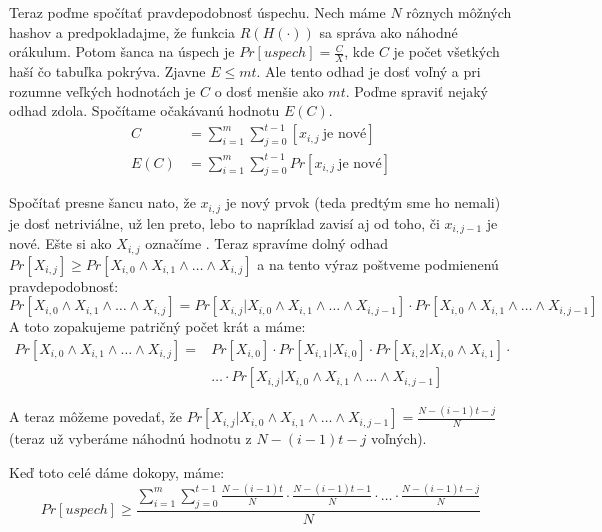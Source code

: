 Teraz poďme spočítať pravdepodobnosť úspechu.
Nech máme $N$ rôznych môžných hashov a predpokladajme, že
funkcia $R(H(\cdot))$ sa správa ako náhodné orákulum.
Potom šanca na úspech je $Pr[uspech] = \frac{C}{X}$,
kde $C$ je počet všetkých haší čo tabuľka pokrýva.
Zjavne $E \leq mt$.
Ale tento odhad je dosť voľný a pri rozumne veľkých hodnotách je $C$ 
o dosť menšie ako $mt$. 
Poďme spraviť nejaký odhad zdola.
Spočítame očakávanú hodnotu $E(C)$.
\begin{align*}
    C &= \sum_{i=1}^m \sum_{j=0}^{t-1} [x_{i,j} ~\text{je nové}] \\
    E(C) &=\sum_{i=1}^m \sum_{j=0}^{t-1} Pr[x_{i,j} ~\text{je nové}] 
\end{align*}

Spočítať presne šancu nato, že $x_{i,j}$ je nový prvok 
(teda predtým sme ho nemali) je dosť netriviálne,
už len preto, lebo to napríklad zavisí aj od toho, či $x_{i,j-1}$ je nové.
Ešte si ako $X_{i,j}$ označíme .
Teraz spravíme dolný odhad 
$Pr[X_{i,j}] \geq Pr[X_{i,0}\land X_{i,1} \land \dots \land X_{i,j}]$
a na tento výraz poštveme podmienenú pravdepodobnosť:
\begin{equation*}
    Pr[X_{i,0} \land X_{i,1} \land \dots \land X_{i,j}] = 
    Pr[X_{i,j} | X_{i,0} \land X_{i,1} \land \dots \land X_{i,j-1} ]
    \cdot
    Pr[X_{i,0} \land X_{i,1} \land \dots \land X_{i,j-1} ]
\end{equation*}
A toto zopakujeme patričný počet krát a máme:
\begin{equation*}
\begin{split}
    Pr[X_{i,0} \land X_{i,1} \land \dots \land X_{i,j}] =&    
    Pr[X_{i,0}] \cdot Pr[X_{i,1} | X_{i,0}] \cdot 
        Pr[X_{i,2} | X_{i,0} \land X_{i,1}] \cdot \\ 
        & \ldots \cdot
        Pr[X_{i,j} | X_{i,0} \land X_{i,1} \land \dots \land X_{i,j-1}]
\end{split}    
\end{equation*}

A teraz môžeme povedať, že
$Pr[X_{i,j} | X_{i,0} \land X_{i,1} \land \dots \land X_{i,j-1}] =
    \frac{N - (i-1)t - j}{N}$
(teraz už vyberáme náhodnú hodnotu z $N - (i-1)t - j$ voľných). 

Keď toto celé dáme dokopy, máme:
\begin{equation*}
    Pr[uspech] \geq \frac{\displaystyle
        \sum_{i=1}^m \sum_{j=0}^{t-1}
            \frac{N - (i-1)t}{N} \cdot \frac{N - (i-1)t - 1}{N} \cdot \dots
            \cdot \frac{N - (i-1)t - j}{N}
        }{N}
\end{equation*}


